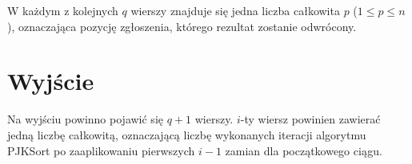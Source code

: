 \documentclass[zad,zawodnik,utf8]{sinol}
\begin{document}
\begin{tasktext}
W każdym z kolejnych $q$ wierszy znajduje się jedna liczba całkowita $p$ ($1 \leq p \leq n$), oznaczająca pozycję zgłoszenia, którego rezultat zostanie odwrócony.
 
 \section{Wyjście}
Na wyjściu powinno pojawić się $q + 1$ wierszy. $i$-ty wiersz powinien zawierać jedną liczbę całkowitą, oznaczającą liczbę wykonanych iteracji algorytmu PJKSort
po zaaplikowaniu pierwszych $i - 1$ zamian dla początkowego ciągu.

\makecompactexample

\end{tasktext}
\end{document}
